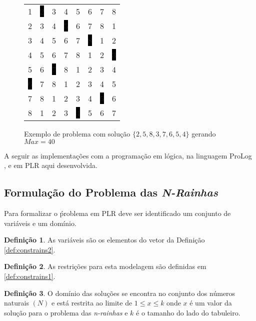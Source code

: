 \documentclass[12pt]{article}
\newcommand{\nrainhas}{\emph{n-rainhas }}
\newcommand{\Nrainhas}{\emph{N-Rainhas }}
\theoremstyle{definition}
\newtheorem{defn}{Definição}[section]
\begin{document}
\begin{figure}[htbp]
\begin{minipage}[htp]{1.00\linewidth}
\centering
\begin{tabular}{c c c c c c c c}
1 & \colorbox{black} {\color{white} 2} & 3 & 4 & 5 & 6 & 7 & 8 \\
2 & 3 & 4 & \colorbox{black} {\color{white} 5} & 6 & 7 & 8 & 1 \\
3 & 4 & 5 & 6 & 7 & \colorbox{black} {\color{white} 8} & 1 & 2 \\
4 & 5 & 6 & 7 & 8 & 1 & 2 & \colorbox{black} {\color{white} 3} \\
5 & 6 & \colorbox{black} {\color{white} 7} & 8 & 1 & 2 & 3 & 4 \\
\colorbox{black} {\color{white} 6} & 7 & 8 & 1 & 2 & 3 & 4 & 5 \\
7 & 8 & 1 & 2 & 3 & 4 & \colorbox{black} {\color{white} 5} & 6 \\
8 & 1 & 2 & 3 & \colorbox{black} {\color{white} 4} & 5 & 6 & 7
\end{tabular}
\end{minipage}
\caption{Exemplo de problema com solução $\{2, 5, 8, 3, 7, 6, 5, 4 \}$ \/ gerando $Max = 40$}
\label{tab:8QueensProblem}
\end{figure}

A seguir as implementações com a programação em lógica, na linguagem ProLog \cite{bratko2001}, 
e em PLR \cite{Marriot_98, wallace2007} aqui desenvolvida.

\subsection{Formulação do Problema das \Nrainhas}

Para formalizar o ṕroblema em PLR deve ser identificado um conjunto de variáveis e um domínio.

\begin{defn}
As variáveis são os elementos do vetor da Definição \ref{def:constrains2}.
\end{defn}

\begin{defn}
As restrições para esta modelagem são definidas em \ref{def:constrains1}.
\end{defn}

\begin{defn}
O domínio das soluções se encontra no conjunto dos números naturais $(N)$ e 
está restrita ao limite de $1 \leq x \leq k$ onde $x$ é um valor da solução 
para o problema das \nrainhas e $k$ é o tamanho do lado do tabuleiro.
\end{defn}
\end{document}

